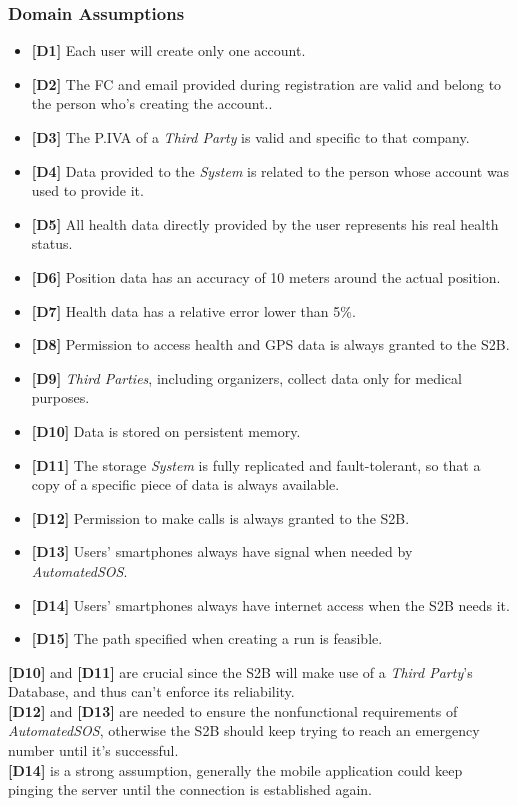 \documentclass[titlepage]{article}
\begin{document}
		\subsubsection{Domain Assumptions}
		\begin{itemize}
		 \item {\bf [D1]}  Each user will create only one account.				
			 \item {\bf [D2]} The FC and email provided during registration are valid and belong to the person who’s creating the account..
   			 \item {\bf [D3]} The P.IVA of a {\it Third Party} is valid and specific to that company.
   			 \item {\bf [D4]}  Data provided to the {\it System} is related to the person whose account was used to provide it.
   			 \item {\bf [D5]} All health data directly provided by the user represents his real health status.
			  \item {\bf [D6]}  Position data has an accuracy of 10 meters around the actual position.				
			 \item {\bf [D7]} Health data has a relative error lower than 5\%.
   			 \item {\bf [D8]} Permission to access health and GPS data is always granted to the S2B.
   			 \item {\bf [D9]} {\it Third Parties}, including organizers, collect data only for medical purposes.
   			 \item {\bf [D10]} Data is stored on persistent memory.
			 \item {\bf [D11]} The storage {\it System} is fully replicated and fault-tolerant, so that a copy of a specific piece of data is always available.			
			 \item {\bf [D12]} Permission to make calls is always granted to the S2B.   			 
			 \item {\bf [D13]} Users’ smartphones always have signal when needed by {\it AutomatedSOS}.
   			 \item {\bf [D14]} Users’ smartphones always have internet access when the S2B needs it.
   			 \item {\bf [D15]} The path specified when creating a run is feasible. \\
		\end{itemize}
		{\bf[D10]} and {\bf [D11]} are crucial since the S2B will make use of a {\it Third Party}’s Database, and thus can’t enforce its reliability.\\
{\bf [D12]} and {\bf [D13]} are needed to ensure the nonfunctional requirements of {\it AutomatedSOS}, otherwise the S2B should keep trying to reach an emergency number until it’s successful.\\
{\bf [D14]} is a strong assumption, generally the mobile application could keep pinging the server until the connection is established again.\\
\end{document}
